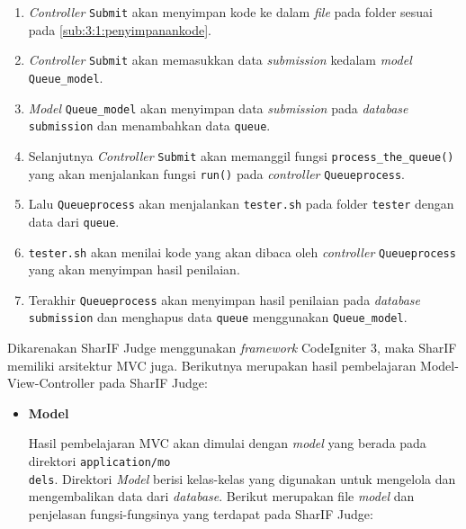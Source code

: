 \documentclass[a4paper,twoside]{article}
\begin{document}
\begin{enumerate}
\begin{itemize}
		            \begin{enumerate}
			            \item \textit{Controller} \verb|Submit| akan menyimpan kode ke dalam \textit{file} pada folder sesuai pada \ref{sub:3:1:penyimpanankode}.
			            \item \textit{Controller} \verb|Submit| akan memasukkan data \textit{submission} kedalam \textit{model} \verb|Queue_model|.
			            \item \textit{Model} \verb|Queue_model| akan menyimpan data \textit{submission} pada \textit{database} \verb|submission| dan menambahkan data \verb|queue|.
			            \item Selanjutnya \textit{Controller} \verb|Submit| akan memanggil fungsi \verb|process_the_queue()| yang akan menjalankan fungsi \verb|run()| pada \textit{controller} \verb|Queueprocess|.
			            \item Lalu \verb|Queueprocess| akan menjalankan \verb|tester.sh| pada folder \verb|tester| dengan data dari \verb|queue|.
			            \item \verb|tester.sh| akan menilai kode yang akan dibaca oleh \textit{controller} \verb|Queueprocess| yang akan menyimpan hasil penilaian.
			            \item Terakhir \verb|Queueprocess| akan menyimpan hasil penilaian pada \textit{database} \verb|submission| dan menghapus data \verb|queue| menggunakan \verb|Queue_model|.
		            \end{enumerate}

	      \end{itemize}

	      Dikarenakan SharIF Judge menggunakan \textit{framework} CodeIgniter 3, maka SharIF memiliki arsitektur MVC juga. Berikutnya merupakan hasil pembelajaran Model-View-Controller pada SharIF Judge:

	      \begin{itemize}
		      \item \textbf{Model}
		            \label{sub:3:1:1:model}

		            Hasil pembelajaran MVC akan dimulai dengan \textit{model} yang berada pada direktori \verb|application/mo|\\\verb|dels|. Direktori \textit{Model} berisi kelas-kelas yang digunakan untuk mengelola dan mengembalikan data dari \textit{database}. Berikut merupakan file \textit{model} dan penjelasan fungsi-fungsinya yang terdapat pada SharIF Judge:


\end{itemize}
\end{enumerate}
\end{document}
